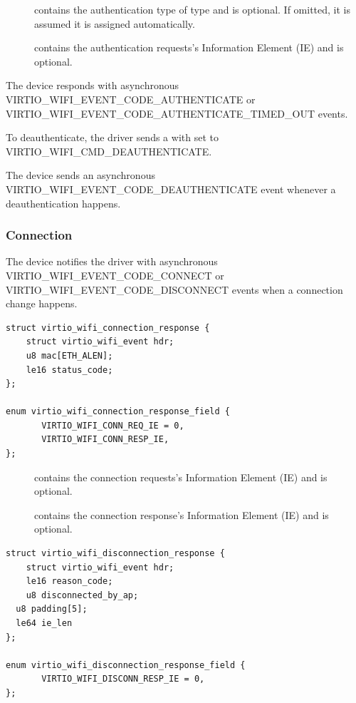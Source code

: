 \begin{description}
  \item[] contains the authentication type of type \hyperref[def:Device Types / 802.11 Device / Device Operation / Common Definitions / Interface Types / enum virtio_wifi_auth_type]{} and is optional. If omitted, it is assumed it is assigned automatically.
\item[] contains the authentication requests's Information Element (IE) and is optional.
\end{description}

The device responds with asynchronous VIRTIO_WIFI_EVENT_CODE_AUTHENTICATE or
	VIRTIO_WIFI_EVENT_CODE_AUTHENTICATE_TIMED_OUT events.

To deauthenticate, the driver sends a  with  set to VIRTIO_WIFI_CMD_DEAUTHENTICATE.

The device sends an asynchronous VIRTIO_WIFI_EVENT_CODE_DEAUTHENTICATE event whenever a deauthentication happens.

\subsubsection{Connection}\label{sec:Device Types / 802.11 Device / Device Operation / Connection}

The device notifies the driver with asynchronous VIRTIO_WIFI_EVENT_CODE_CONNECT or
	VIRTIO_WIFI_EVENT_CODE_DISCONNECT events when a connection change happens.

\begin{lstlisting}
struct virtio_wifi_connection_response {
	struct virtio_wifi_event hdr;
	u8 mac[ETH_ALEN];
	le16 status_code;
};

enum virtio_wifi_connection_response_field {
       VIRTIO_WIFI_CONN_REQ_IE = 0,
       VIRTIO_WIFI_CONN_RESP_IE,
};
\end{lstlisting}

\begin{description}
\item[] contains the connection requests's Information Element (IE) and is optional.
\item[] contains the connection response's Information Element (IE) and is optional.
\end{description}

\begin{lstlisting}
struct virtio_wifi_disconnection_response {
	struct virtio_wifi_event hdr;
	le16 reason_code;
	u8 disconnected_by_ap;
  u8 padding[5];
  le64 ie_len
};

enum virtio_wifi_disconnection_response_field {
       VIRTIO_WIFI_DISCONN_RESP_IE = 0,
};
\end{lstlisting}

